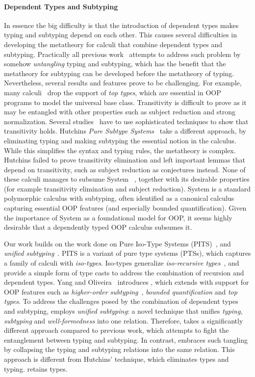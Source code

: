 \paragraph{Dependent Types and Subtyping}
In essence the big difficulty is that the introduction of dependent
types makes typing and subtyping depend on each other. This causes
several difficulties in developing the metatheory for calculi that
combine dependent types and subtyping. Practically all previous
work~\cite{subdep,ptssub,chen1,cocsub,Chen03coc} attempts to address such problem by somehow
\emph{untangling} typing and subtyping, which has the benefit that the
metatheory for subtyping can be developed before the metatheory of
typing. Nevertheless, several results and features prove to be
challenging. For example, many calculi~\cite{subdep,ptssub}
drop the support of \emph{top types}, which are essential in OOP
programs to model the universal base class. Transitivity is difficult
to prove as it may be entangled with other properties such as
subject reduction and strong normalization.
Several studies~\cite{subdep,chen1} have
to use sophisticated techniques to show that transitivity
holds. Hutchins \emph{Pure
  Subtype Systems}~\cite{hutchins} take a different approach, by
eliminating typing and making subtyping the essential notion in the
calculus.  While this simplifies the syntax and typing rules, the metatheory is complex. Hutchins failed
to prove transitivity elimination and left
important lemmas that depend on transitivity, such as
subject reduction as
conjectures instead.
None of these calculi manages to subsume
System \fsub~\cite{fsub}, together with its desirable properties (for
example transitivity elimination and subject reduction). System
\fsub is a standard polymorphic calculus with subtyping, often
identified as a canonical calculus capturing
essential OOP features (and especially bounded quantification).
Given the importance of System \fsub as a foundational
model for OOP, it seems highly desirable that a dependently
typed OOP calculus subsumes it.

Our work builds on the work done on Pure Iso-Type Systems (PITS)~\cite{???}, and
\emph{unified subtyping}~\cite{full}. PITS is a variant of pure type systems (PTSs),
which captures a family of calculi with \emph{iso-types}. Iso-types generalize \emph{iso-recursive
types}~\cite{tapl}, and provide a simple form of
type casts to address the combination of recursion and
dependent types.
Yang and Oliveira~\cite{full} introduces \name, which extends
\lami with support for OOP features such as
\emph{higher-order subtyping}~\cite{fsubo}, \emph{bounded quantification} and
\emph{top types}.
To address the challenges posed by
the combination of dependent types and subtyping, \name
employs \emph{unified subtyping}: a novel technique that unifies
\emph{typing}, \emph{subtyping} and \emph{well-formedness} into one
relation. Therefore, \name takes a significantly different
approach compared to previous work, which
attempts to fight the entanglement between typing and subtyping. In
contrast, \name embraces such
tangling by collapsing the typing and subtyping
relations into the same relation.  This approach is different from
Hutchins' technique, which eliminates types and typing. \name
retains types. 


